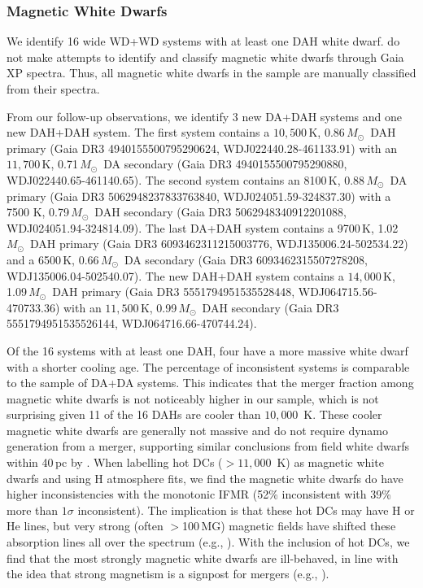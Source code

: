 \documentclass[twocolumn]{aastex631}
\newcommand{\msun}{$M_{\odot}$}
\begin{document}
\subsubsection{Magnetic White Dwarfs}
We identify 16 wide WD+WD systems with at least one DAH white dwarf. \cite{2024A&A...682A...5V} do not make attempts to identify and classify magnetic white dwarfs through Gaia XP spectra. Thus, all magnetic white dwarfs in the sample are manually classified from their spectra. 

From our follow-up observations, we identify 3 new DA+DAH systems and one new DAH+DAH system. The first system contains a $10{,}500$\,K, 0.86\,\msun\ DAH primary (Gaia DR3 4940155500795290624, WDJ022440.28-461133.91) with an $11{,}700$\,K, 0.71\,\msun\ DA secondary (Gaia DR3 4940155500795290880, WDJ022440.65-461140.65). The second system contains an 8100\,K, 0.88\,\msun\ DA primary (Gaia DR3 5062948237833763840, WDJ024051.59-324837.30) with a 7500 K, 0.79\,\msun\ DAH secondary (Gaia DR3 5062948340912201088, WDJ024051.94-324814.09). The last DA+DAH system contains a 9700\,K, 1.02\,\msun\ DAH primary (Gaia DR3 6093462311215003776, WDJ135006.24-502534.22) and a 6500\,K, 0.66\,\msun\ DA secondary (Gaia DR3 6093462315507278208, WDJ135006.04-502540.07). The new DAH+DAH system contains a $14{,}000$\,K, 1.09\,\msun\ DAH primary (Gaia DR3 5551794951535528448, WDJ064715.56-470733.36) with an $11{,}500$\,K, 0.99\,\msun\ DAH secondary (Gaia DR3 5551794951535526144, WDJ064716.66-470744.24).

Of the 16 systems with at least one DAH, four have a more massive white dwarf with a shorter cooling age. The percentage of inconsistent systems is comparable to the sample of DA+DA systems. This indicates that the merger fraction among magnetic white dwarfs is not noticeably higher in our sample, which is not surprising given 11 of the 16 DAHs are cooler than $10{,}000$~K. These cooler magnetic white dwarfs are generally not massive and do not require dynamo generation from a merger, supporting similar conclusions from field white dwarfs within 40\,pc by \citet{2022ApJ...935L..12B}. When labelling hot DCs ($>11{,}000$~K) as magnetic white dwarfs and using H atmosphere fits, we find the magnetic white dwarfs do have higher inconsistencies with the monotonic IFMR (52\% inconsistent with 39\% more than $1\sigma$ inconsistent). The implication is that these hot DCs may have H or He lines, but very strong (often $>$100\,MG) magnetic fields have shifted these absorption lines all over the spectrum (e.g., \citealt{2021Natur.595...39C}). With the inclusion of hot DCs, we find that the most strongly magnetic white dwarfs are ill-behaved, in line with the idea that strong magnetism is a signpost for mergers (e.g., \citealt{2023MNRAS.518.2341K}).
\end{document}

